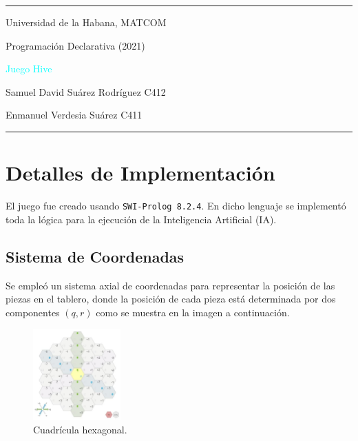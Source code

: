 \documentclass[a4paper,11pt]{article}
\begin{document}
\begin{center}
\begin{Large}
\rule{\textwidth}{0.5pt}
\par Universidad de la Habana, MATCOM
\par Programación Declarativa (2021)
\vspace{0.4cm}
\par \textcolor{cyan}{Juego Hive}
\end{Large}

\vspace{1mm}
\par Samuel David Suárez Rodríguez C412
\par Enmanuel Verdesia Suárez C411
\rule{\textwidth}{1.5pt}
\end{center}

\vspace{0.5cm}



\section{Detalles de Implementación}

El juego fue creado usando \verb+SWI-Prolog 8.2.4+. En dicho lenguaje se implementó toda la lógica para la ejecución de la Inteligencia Artificial (IA).

\subsection{Sistema de Coordenadas}

Se empleó un sistema axial de coordenadas para representar la posición de las piezas en el tablero, donde la posición de cada pieza está determinada por dos componentes $(q, r)$ como se muestra en la imagen a continuación.

\begin{figure}[H]
\centering
\includegraphics[width=0.3\textwidth]{images/hex_grid.jpg}
\caption{Cuadrícula hexagonal.}
\end{figure}
\end{document}
